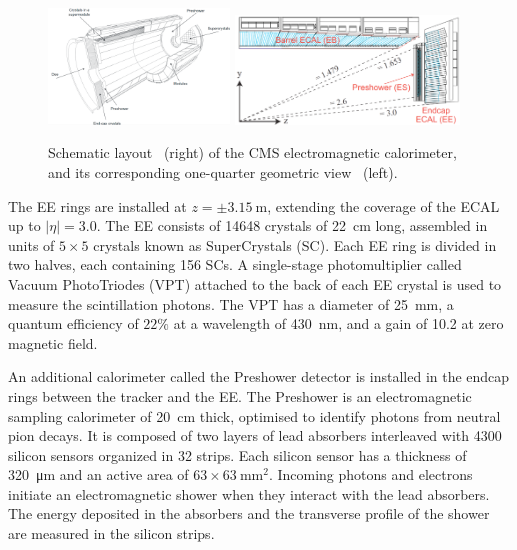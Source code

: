 \begin{figure}[!htbp]
 \begin{center}
  \includegraphics[width=0.43\textwidth]{Figures/Experiment/CMS/ECALLayout_1.png}
  \includegraphics[width=0.53\textwidth]{Figures/Experiment/CMS/ECALLayout_2.png}
 \end{center}
 \caption{Schematic layout~\cite{CMS} (right) of the CMS electromagnetic calorimeter, and its corresponding one-quarter geometric view~\cite{CMSECAL} (left).}
 \label{fig:CMS_ECAL}
\end{figure}

The EE rings are installed at $z = {\pm}\SI{3.15}{\m}$, extending the coverage of the ECAL up to $|\eta| = 3.0$. The EE consists of 14648 crystals of \SI{22}{\cm} long, assembled in units of $5{\times}5$ crystals known as SuperCrystals (SC). Each EE ring is divided in two halves, each containing 156 SCs. A single-stage photomultiplier called Vacuum PhotoTriodes (VPT) attached to the back of each EE crystal is used to measure the scintillation photons. The VPT has a diameter of \SI{25}{\mm}, a quantum efficiency of $22\%$ at a wavelength of \SI{430}{\nm}, and a gain of 10.2 at zero magnetic field.

An additional calorimeter called the Preshower detector is installed in the endcap rings between the tracker and the EE. The Preshower is an electromagnetic sampling calorimeter of \SI{20}{\cm} thick,  optimised to identify photons from neutral pion decays. It is composed of two layers of lead absorbers interleaved with 4300 silicon sensors organized in 32 strips. Each silicon sensor has a thickness of \SI{320}{\um} and an active area of $63{\times}\SI{63}{\mm\squared}$. Incoming photons and electrons initiate an electromagnetic shower when they interact with the lead absorbers. The energy deposited in the absorbers and the transverse profile of the shower are measured in the silicon strips.

